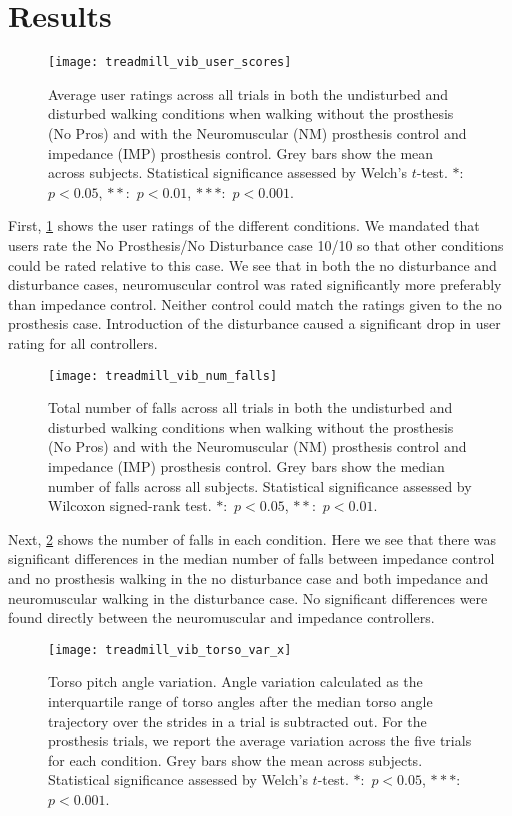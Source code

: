 \section{Results}
\begin{figure}[h]
    \centering 
    \texttt{[image: treadmill\_vib\_user\_scores]}
    \caption{Average user ratings across all trials in both the undisturbed and
    disturbed walking conditions when walking without the prosthesis (No Pros)
    and with the Neuromuscular (NM) prosthesis control and impedance (IMP)
    prosthesis control. Grey bars show the mean across subjects.  Statistical
    significance assessed by Welch's $t$-test. $*$:~$p < 0.05$, $**$:~$p <
    0.01$, $***$:~$p < 0.001$.}\label{fig:treadmill_user_ratings}
\end{figure}
First, \cref{fig:treadmill_user_ratings} shows the user ratings of the different
conditions. We mandated that users rate the No Prosthesis/No Disturbance case
10/10 so that other conditions could be rated relative to this case. We see that
in both the no disturbance and disturbance cases, neuromuscular control was
rated significantly more preferably than impedance control. Neither control
could match the ratings given to the no prosthesis case. Introduction of the
disturbance caused a significant drop in user rating for all controllers. 

\begin{figure}[t]
    \centering 
    \texttt{[image: treadmill\_vib\_num\_falls]}
    \caption{Total number of falls across all trials in both the undisturbed and
    disturbed walking conditions when walking without the prosthesis (No Pros)
    and with the Neuromuscular (NM) prosthesis control and impedance (IMP)
    prosthesis control. Grey bars show the median number of falls across all
    subjects. Statistical significance assessed by Wilcoxon signed-rank test.
    $*$:~$p < 0.05$, $**$:~$p < 0.01$.}\label{fig:treadmill_exp_falls}
\end{figure}
Next, \cref{fig:treadmill_exp_falls} shows the number of falls in each
condition. Here we see that there was significant differences in the median
number of falls between impedance control and no prosthesis walking in the no
disturbance case and both impedance and neuromuscular walking in the disturbance
case. No significant differences were found directly between the neuromuscular
and impedance controllers.

\begin{figure}[b]
    \centering 
    \texttt{[image: treadmill\_vib\_torso\_var\_x]}
    \caption{Torso pitch angle variation. Angle variation calculated as the
    interquartile range of torso angles after the median torso angle trajectory
    over the strides in a trial is subtracted out. For the prosthesis trials, we
    report the average variation across the five trials for each condition.
    Grey bars show the mean across subjects.  Statistical significance assessed
    by Welch's $t$-test. $*$:~$p < 0.05$, $***$:~$p <
    0.001$.}\label{fig:treadmill_exp_torso_var_x}
\end{figure}

